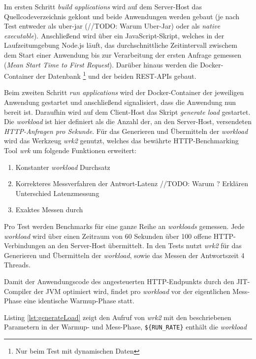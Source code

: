 Im ersten Schritt \textit{build applications} wird auf dem Server-Host das Quellcodeverzeichnis geklont und beide Anwendungen werden gebaut
(je nach Test entweder als uber-jar (//TODO: Warum Uber-Jar) oder als \textit{native executable}). Anschließend wird über ein JavaScript-Skript,
welches in der Laufzeitumgebung Node.js läuft, das durchschnittliche Zeitintervall zwischem dem Start einer Anwendung bis
zur Verarbeitung der ersten Anfrage gemessen
(\textit{Mean Start Time to First Request}). Darüber hinaus werden die Docker-Container der Datenbank
\footnote{Nur beim Test mit dynamischen Daten} und der beiden REST-APIs gebaut.

Beim zweiten Schritt \textit{run applications} wird der Docker-Container der jeweiligen Anwendung gestartet und anschließend signalisiert,
dass die Anwendung nun bereit ist.
Daraufhin wird auf dem Client-Host das Skript \textit{generate load} gestartet.
Die \textit{workload} ist hier definiert als die Anzahl der, an den Server-Host, versendeten \textit{HTTP-Anfragen pro Sekunde}.
Für das Generieren und Übermitteln der \textit{workload} wird das Werkzeug \textit{wrk2} genutzt, welches das
bewährte HTTP-Benchmarking Tool \textit{wrk} um folgende Funktionen erweitert:
\begin{enumerate}
	\item Konstanter \textit{workload} Durchsatz
	\item Korrekteres Messverfahren der Antwort-Latenz //TODO: Warum ? Erklären Unterschied Latenzmessung
	\item Exaktes Messen durch 
\end{enumerate}\parencite{Wrk2, Wrk}

Pro Test werden Benchmarks für eine ganze Reihe an \textit{workloads} gemessen.
Jede \textit{workload} wird über einen Zeitraum von 60 Sekunden über 100 offene HTTP-Verbindungen an den Server-Host übermittelt.
In den Tests nutzt \textit{wrk2} für das Generieren und Übermitteln der \textit{workload}, sowie das Messen der Antwortszeit
4 Threads.

Damit der Anwendungscode des angesteuerten HTTP-Endpunkts durch den JIT-Compiler der JVM optimiert wird,
findet pro \textit{workload} vor der eigentlichen Mess-Phase eine identische Warmup-Phase statt.

Listing \ref*{lst:generateLoad} zeigt den Aufruf von \textit{wrk2} mit den beschriebenen Parametern in der Warmup- und Mess-Phase,
\verb|${RUN_RATE}| enthält die \textit{workload}

